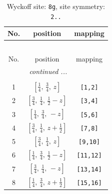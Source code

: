 \documentclass[fleqn,8pt]{jsarticle}
\begin{document}
\renewcommand{\arraystretch}{1.2}
\begin{longtable}{ccc}
\caption{Wyckoff site: {\tt 8g}, site symmetry: {\tt 2..}}
 \\
 \hline \hline
No. & position & mapping \\ \hline \endfirsthead

\multicolumn{2}{l}{\tablename\ \thetable{}} \\
 \hline \hline
No. & position & mapping \\ \hline \endhead

 \hline \hline
\multicolumn{2}{r}{\footnotesize\it continued ...} \\ \endfoot

 \hline \hline
\multicolumn{2}{r}{} \\ \endlastfoot

1 & $\left[ \frac{1}{4},\, \frac{3}{4},\, z \right]$ & {\tt [1,2]} \\ \hline
2 & $\left[ \frac{3}{4},\, \frac{1}{4},\, \frac{1}{2} - z \right]$ & {\tt [3,4]} \\ \hline
3 & $\left[ \frac{1}{4},\, \frac{3}{4},\, - z \right]$ & {\tt [5,6]} \\ \hline
4 & $\left[ \frac{3}{4},\, \frac{1}{4},\, z + \frac{1}{2} \right]$ & {\tt [7,8]} \\ \hline
5 & $\left[ \frac{3}{4},\, \frac{1}{4},\, z \right]$ & {\tt [9,10]} \\ \hline
6 & $\left[ \frac{1}{4},\, \frac{3}{4},\, \frac{1}{2} - z \right]$ & {\tt [11,12]} \\ \hline
7 & $\left[ \frac{3}{4},\, \frac{1}{4},\, - z \right]$ & {\tt [13,14]} \\ \hline
8 & $\left[ \frac{1}{4},\, \frac{3}{4},\, z + \frac{1}{2} \right]$ & {\tt [15,16]} \\
\end{longtable}
\renewcommand{\arraystretch}{1.2}
\end{document}
